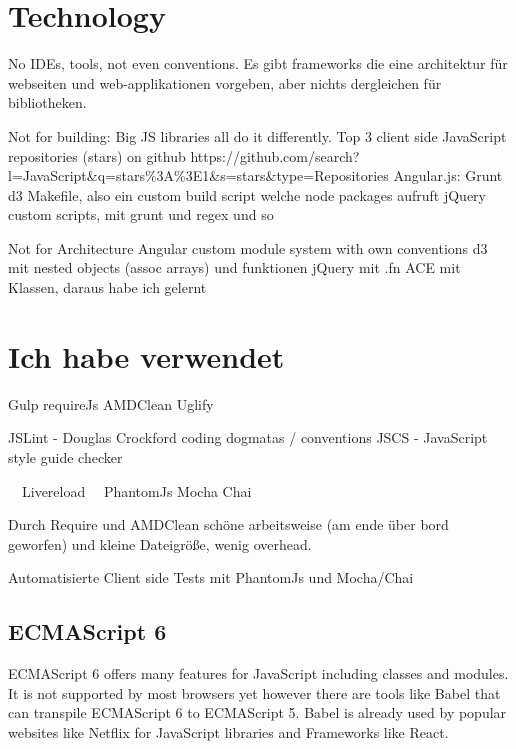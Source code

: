 
\section{Technology}


No IDEs, tools, not even conventions. Es gibt frameworks die eine architektur für webseiten und web-applikationen vorgeben, aber nichts dergleichen für bibliotheken.

Not for building:
Big JS libraries all do it differently.
Top 3 client side JavaScript repositories (stars) on github
https://github.com/search?l=JavaScript\&q=stars\%3A\%3E1\&s=stars\&type=Repositories
Angular.js: Grunt
d3 Makefile, also ein custom build script welche node packages aufruft
jQuery custom scripts, mit grunt und regex und so

Not for Architecture
Angular custom module system with own conventions
d3 mit nested objects (assoc arrays) und funktionen
jQuery mit .fn
ACE mit Klassen, daraus habe ich gelernt

\section{Ich habe verwendet}

Gulp
requireJs
AMDClean
Uglify

JSLint - Douglas Crockford coding dogmatas / conventions
JSCS - JavaScript style guide checker

~~Livereload~~
PhantomJs
Mocha
Chai

Durch Require und AMDClean schöne arbeitsweise (am ende über bord geworfen) und kleine Dateigröße, wenig overhead.

Automatisierte Client side Tests mit PhantomJs und Mocha/Chai

\subsection{ECMAScript 6} 

ECMAScript 6 offers many features for JavaScript including classes and modules. It is not supported by most browsers yet however there are tools like Babel that can transpile ECMAScript 6 to ECMAScript 5. Babel is already used by popular websites like Netflix for JavaScript libraries and Frameworks like React. 

